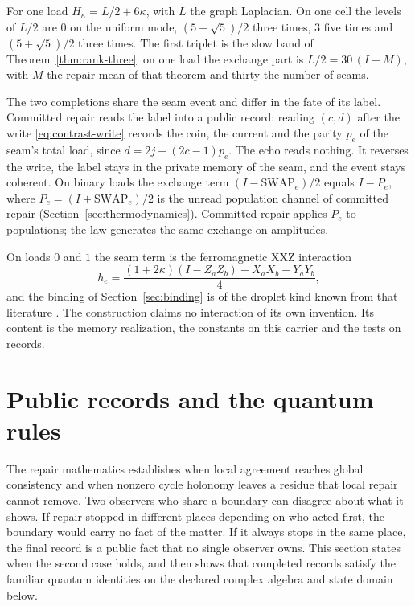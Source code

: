 \documentclass[11pt]{article}
\theoremstyle{definition}
\theoremstyle{remark}
\begin{document}
For one load $H_\kappa=L/2+6\kappa$, with $L$ the graph Laplacian. On one
cell the levels of $L/2$ are $0$ on the uniform mode, $(5-\sqrt5)/2$ three
times, $3$ five times and $(5+\sqrt5)/2$ three times. The first triplet is
the slow band of Theorem~\ref{thm:rank-three}: on one load the exchange
part is $L/2=30\,(I-M)$, with $M$ the repair mean of that theorem and
thirty the number of seams.

The two completions share the seam event and differ in the fate of its
label. Committed repair reads the label into a public record: reading
$(c,d)$ after the write \eqref{eq:contrast-write} records the coin, the
current and the parity $p_e$ of the seam's total load, since
$d=2j+(2c-1)p_e$. The echo reads nothing. It reverses the
write, the label stays in the private memory of the seam, and the event
stays coherent. On binary loads the exchange term
$(I-\mathrm{SWAP}_e)/2$ equals $I-P_e$, where $P_e=(I+\mathrm{SWAP}_e)/2$
is the unread population channel of committed repair
(Section~\ref{sec:thermodynamics}). Committed repair applies $P_e$ to
populations; the law generates the same exchange on amplitudes.

On loads $0$ and $1$ the seam term is the ferromagnetic XXZ interaction
\begin{equation}
 h_e=\frac{(1+2\kappa)(I-Z_aZ_b)-X_aX_b-Y_aY_b}{4},
\label{eq:xxz}
\end{equation}
and the binding of Section~\ref{sec:binding} is of the droplet kind known
from that literature \cite{nachtergaelestarr2001,fischbacherstolz2018}.
The construction claims no interaction of its own invention. Its content
is the memory realization, the constants on this carrier and the tests on
records.

\section{Public records and the quantum rules}
\label{sec:consensus}

The repair mathematics establishes when local agreement reaches global
consistency and when nonzero cycle holonomy leaves a residue that local
repair cannot remove.
Two observers who share a boundary can disagree about what it shows. If
repair stopped in different places depending on who acted first, the
boundary would carry no fact of the matter. If it always stops in the same
place, the final record is a public fact that no single observer owns. This
section states when the second case holds, and then shows that completed
records satisfy the familiar quantum identities on the declared complex
algebra and state domain below.
\end{document}
